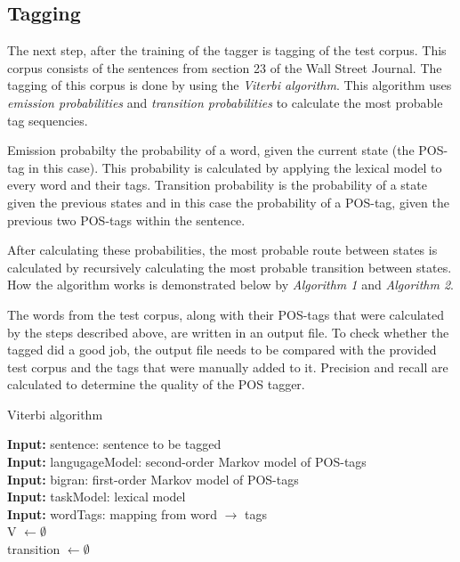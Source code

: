 \documentclass[10pt, a4paper]{article}
\begin{document}
\subsection*{Tagging}
The next step, after the training of the tagger is tagging of the test corpus. This corpus consists of the sentences from section 23 of the Wall Street Journal. The tagging of this corpus is done by using the \textit{Viterbi algorithm}. This algorithm uses \textit{emission probabilities} and \textit{transition probabilities} to calculate the most probable tag sequencies. 

Emission probabilty the probability of a word, given the current state (the POS-tag in this case). This probability is calculated by applying the lexical model to every word and their tags. Transition probability is the probability of a state given the previous states and in this case the probability of a POS-tag, given the previous two POS-tags within the sentence.

After calculating these probabilities, the most probable route between states is calculated by recursively calculating the most probable transition between states. How the algorithm works is demonstrated below by \textit{Algorithm 1} and \textit{Algorithm 2}.

The words from the test corpus, along with their POS-tags that were calculated by the steps described above, are written in an output file. To check whether the tagged did a good job, the output file needs to be compared with the provided test corpus and the tags that were manually added to it. Precision and recall are calculated to determine the quality of the POS tagger.


\begin{algorithm}[H]
\caption{Viterbi algorithm}
\SetAlgoLined
\textbf{Input:} sentence: sentence to be tagged\\
\textbf{Input:} langugageModel: second-order Markov model of POS-tags\\
\textbf{Input:} bigran: first-order Markov model of POS-tags\\
\textbf{Input:} taskModel: lexical model\\
\textbf{Input:} wordTags: mapping from word $\rightarrow$ tags\\
V $\leftarrow \emptyset$\\
transition $\leftarrow \emptyset$\\
\end{algorithm}
\end{document}
